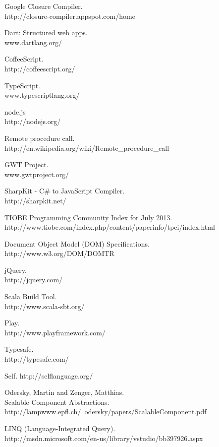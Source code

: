 \begin{thebibliography}{99}
	Google Closure Compiler.\\
	http://closure-compiler.appspot.com/home
	
	Dart: Structured web apps.\\
	www.dartlang.org/
	
	CoffeeScript.\\
	http://coffeescript.org/
	
	TypeScript.\\
	www.typescriptlang.org/
	
	node.js\\
	http://nodejs.org/
	
	Remote procedure call.\\
	http://en.wikipedia.org/wiki/Remote\_procedure\_call
	
	GWT Project.\\
	www.gwtproject.org/
	
	SharpKit - C\# to JavaScript Compiler.\\
	http://sharpkit.net/
	
	TIOBE Programming Community Index for July 2013.\\
	http://www.tiobe.com/index.php/content/paperinfo/tpci/index.html
	
	Document Object Model (DOM) Specifications.\\
	http://www.w3.org/DOM/DOMTR
		
	jQuery.\\
	http://jquery.com/
	
	Scala Build Tool.\\
	http://www.scala-sbt.org/
	
	Play.\\
	http://www.playframework.com/
	
	Typesafe.\\
	http://typesafe.com/
	
	Self.
	http://selflanguage.org/
	
	{\sc Odersky,} Martin and {\sc Zenger,} Matthias.\\
	Scalable Component Abstractions.\\
	http://lampwww.epfl.ch/~odersky/papers/ScalableComponent.pdf
	
  LINQ (Language-Integrated Query).\\
  http://msdn.microsoft.com/en-us/library/vstudio/bb397926.aspx
	

\end{thebibliography}
